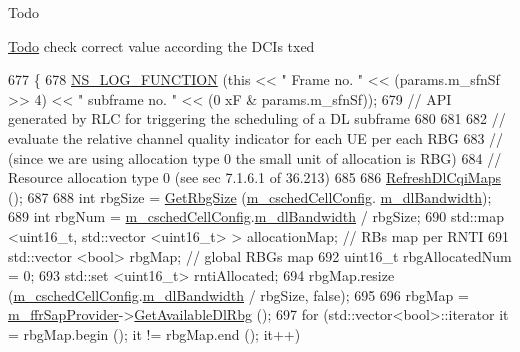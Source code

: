 \begin{DoxyRefDesc}{Todo}
\item[\hyperlink{todo__todo000133}{Todo}]check correct value according the D\+C\+Is txed \end{DoxyRefDesc}

\begin{DoxyCode}
677 \{
678   \hyperlink{log-macros-disabled_8h_a90b90d5bad1f39cb1b64923ea94c0761}{NS\_LOG\_FUNCTION} (\textcolor{keyword}{this} << \textcolor{stringliteral}{" Frame no. "} << (params.m\_sfnSf >> 4) << \textcolor{stringliteral}{" subframe no. "} << (0
      xF & params.m\_sfnSf));
679   \textcolor{comment}{// API generated by RLC for triggering the scheduling of a DL subframe}
680 
681 
682   \textcolor{comment}{// evaluate the relative channel quality indicator for each UE per each RBG}
683   \textcolor{comment}{// (since we are using allocation type 0 the small unit of allocation is RBG)}
684   \textcolor{comment}{// Resource allocation type 0 (see sec 7.1.6.1 of 36.213)}
685 
686   \hyperlink{classns3_1_1PssFfMacScheduler_a2e7bc40b4840831d734e10bea3124046}{RefreshDlCqiMaps} ();
687 
688   \textcolor{keywordtype}{int} rbgSize = \hyperlink{classns3_1_1PssFfMacScheduler_aa3caedda9572ce0438063926b19d7efb}{GetRbgSize} (\hyperlink{classns3_1_1PssFfMacScheduler_a6808e2b2024ed0ced82f80bfe6f0801f}{m\_cschedCellConfig}.
      \hyperlink{structns3_1_1FfMacCschedSapProvider_1_1CschedCellConfigReqParameters_ad18c695bd3c9d7f742ba1dab4a941e8a}{m\_dlBandwidth});
689   \textcolor{keywordtype}{int} rbgNum = \hyperlink{classns3_1_1PssFfMacScheduler_a6808e2b2024ed0ced82f80bfe6f0801f}{m\_cschedCellConfig}.\hyperlink{structns3_1_1FfMacCschedSapProvider_1_1CschedCellConfigReqParameters_ad18c695bd3c9d7f742ba1dab4a941e8a}{m\_dlBandwidth} / rbgSize;
690   std::map <uint16\_t, std::vector <uint16\_t> > allocationMap; \textcolor{comment}{// RBs map per RNTI}
691   std::vector <bool> rbgMap;  \textcolor{comment}{// global RBGs map}
692   uint16\_t rbgAllocatedNum = 0;
693   std::set <uint16\_t> rntiAllocated;
694   rbgMap.resize (\hyperlink{classns3_1_1PssFfMacScheduler_a6808e2b2024ed0ced82f80bfe6f0801f}{m\_cschedCellConfig}.\hyperlink{structns3_1_1FfMacCschedSapProvider_1_1CschedCellConfigReqParameters_ad18c695bd3c9d7f742ba1dab4a941e8a}{m\_dlBandwidth} / rbgSize, \textcolor{keyword}{false});
695 
696   rbgMap = \hyperlink{classns3_1_1PssFfMacScheduler_a8b7889293dd002f806e2d6afd9c50aed}{m\_ffrSapProvider}->\hyperlink{classns3_1_1LteFfrSapProvider_ad60306dae43b74dc25b65f81d6587a24}{GetAvailableDlRbg} ();
697   \textcolor{keywordflow}{for} (std::vector<bool>::iterator it = rbgMap.begin (); it != rbgMap.end (); it++)

\end{DoxyCode}
